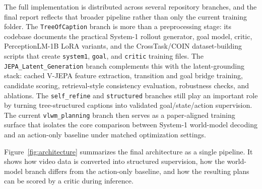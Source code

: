 \documentclass[11pt]{article}
\begin{document}
The full implementation is distributed across several repository branches, and the final report reflects that broader pipeline rather than only the current training folder. The \texttt{TreeOfCaption} branch is more than a preprocessing stage: its codebase documents the practical System-1 rollout generator, goal model, critic, PerceptionLM-1B LoRA variants, and the CrossTask/COIN dataset-building scripts that create \texttt{system1}, \texttt{goal}, and \texttt{critic} training files. The \texttt{JEPA\_Latent\_Generation} branch complements this with the latent-grounding stack: cached V-JEPA feature extraction, transition and goal bridge training, candidate scoring, retrieval-style consistency evaluation, robustness checks, and ablations. The \texttt{self\_refine} and \texttt{structured} branches still play an important role by turning tree-structured captions into validated goal/state/action supervision. The current \texttt{vlwm\_planning} branch then serves as a paper-aligned training surface that isolates the core comparison between System-1 world-model decoding and an action-only baseline under matched optimization settings.

Figure~\ref{fig:architecture} summarizes the final architecture as a single pipeline. It shows how video data is converted into structured supervision, how the world-model branch differs from the action-only baseline, and how the resulting plans can be scored by a critic during inference.
\end{document}
